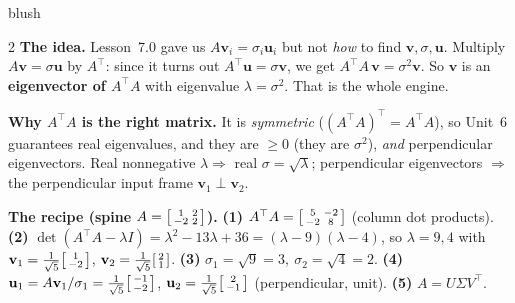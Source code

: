 \documentclass[10pt]{article}
\newcommand{\uu}{\mathbf{u}}
\newcommand{\vv}{\mathbf{v}}
\newcommand{\T}{^{\top}}
\begin{document}
\begin{skillbox}[Lesson]{blush}
\begin{multicols}{2}
\textbf{The idea.} Lesson~7.0 gave us $A\vv_i=\sigma_i\uu_i$ but not \emph{how} to find $\vv,\sigma,\uu$.
Multiply $A\vv=\sigma\uu$ by $A\T$: since it turns out $A\T\uu=\sigma\vv$, we get
$A\T A\,\vv=\sigma^2\vv$. So $\vv$ is an \textbf{eigenvector of $A\T A$} with eigenvalue
$\lambda=\sigma^2$. That is the whole engine.

\textbf{Why $A\T A$ is the right matrix.} It is \emph{symmetric} ($ (A\T A)\T=A\T A$), so Unit~6
guarantees real eigenvalues, and they are $\ge0$ (they are $\sigma^2$), \emph{and} perpendicular
eigenvectors. Real nonnegative $\lambda\Rightarrow$ real $\sigma=\sqrt{\lambda}$; perpendicular
eigenvectors $\Rightarrow$ the perpendicular input frame $\vv_1\perp\vv_2$.

\columnbreak

\textbf{The recipe (spine $A=\begin{bsmallmatrix} 1 & 2\\ -2 & 2 \end{bsmallmatrix}$).}
\textbf{(1)} $A\T A=\begin{bsmallmatrix} 5 & -2\\ -2 & 8 \end{bsmallmatrix}$ (column dot products).
\textbf{(2)} $\det(A\T A-\lambda I)=\lambda^2-13\lambda+36=(\lambda-9)(\lambda-4)$, so $\lambda=9,4$ with
$\vv_1=\tfrac1{\sqrt5}\begin{bsmallmatrix} 1\\ -2 \end{bsmallmatrix}$,
$\vv_2=\tfrac1{\sqrt5}\begin{bsmallmatrix} 2\\ 1 \end{bsmallmatrix}$.
\textbf{(3)} $\sigma_1=\sqrt9=3,\ \sigma_2=\sqrt4=2$.
\textbf{(4)} $\uu_1=A\vv_1/\sigma_1=\tfrac1{\sqrt5}\begin{bsmallmatrix} -1\\ -2 \end{bsmallmatrix}$,
$\uu_2=\tfrac1{\sqrt5}\begin{bsmallmatrix} 2\\ -1 \end{bsmallmatrix}$ (perpendicular, unit).
\textbf{(5)} $A=U\Sigma V\T$.
\end{multicols}
\end{skillbox}
\end{document}
